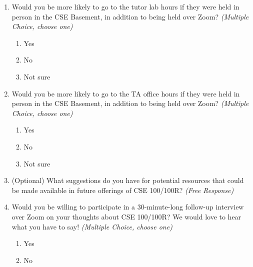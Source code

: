 \begin{enumerate}
    \item Would you be more likely to go to the tutor lab hours if they were held in person in the CSE Basement, in addition to being held over Zoom? \textit{(Multiple Choice, choose one)}
    \begin{enumerate}
        \item Yes
        \item No
        \item Not sure
    \end{enumerate}

    \item Would you be more likely to go to the TA office hours if they were held in person in the CSE Basement, in addition to being held over Zoom? \textit{(Multiple Choice, choose one)}
    \begin{enumerate}
        \item Yes
        \item No
        \item Not sure
    \end{enumerate}

    \item (Optional) What suggestions do you have for potential resources that could be made available in future offerings of CSE 100/100R? \textit{(Free Response)}

    \item Would you be willing to participate in a 30-minute-long follow-up interview over Zoom on your thoughts about CSE 100/100R? We would love to hear what you have to say! \textit{(Multiple Choice, choose one)}
    \begin{enumerate}
        \item Yes
        \item No
    \end{enumerate}
\end{enumerate}